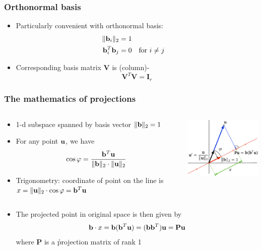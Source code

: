 \documentclass[t]{beamer} %
\begin{document}
\begin{frame}
  \frametitle{Orthonormal basis}

  \begin{itemize}
  \item Particularly convenient with orthonormal basis:
    \begin{align*}
      \norm[2]{\vb_i} &= 1 \\
      \vb_i^T \vb_j &= 0 && \text{for } i\neq j
    \end{align*}
  \item Corresponding basis matrix $\mathbf{V}$ is (column)-
    \[
    \mathbf{V}^T \mathbf{V} = \mathbf{I}_r
    \]
  \end{itemize}
\end{frame}

\begin{frame}
  \frametitle{The mathematics of projections}

  \begin{columns}[c]
    \begin{column}{50mm}
      \begin{itemize}
      \item 1-d subspace spanned by basis vector
        $\norm[2]{\vb} = 1$
      \item For any point $\vu$, we have
        \[
          \cos \varphi = \frac{\vb^T \vu}{\norm[2]{\vb}\cdot \norm[2]{\vu}}
        \]
      \item<2-> Trigonometry: coordinate of point on the line is
        $x = \norm[2]{\vu}\cdot \cos\varphi = \vb^T \vu$
      \end{itemize}
    \end{column}
    \begin{column}{50mm}
      \includegraphics[width=50mm]{img/3_cosine_projection}
    \end{column}
  \end{columns}
  
  \begin{itemize}
  \item<3-> The projected point in original space is then given by
    \[
      \vb\cdot x = \vb (\vb^T \vu) = (\vb \vb^T) \vu = \mathbf{P} \vu
    \]
    where $\mathbf{P}$ is a \h{projection matrix} of rank 1
  \end{itemize}
\end{frame}
\end{document}
